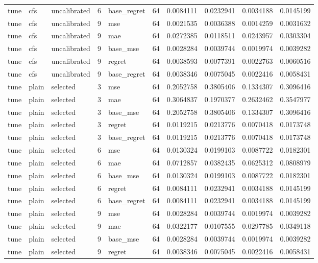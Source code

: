 \begin{tabular}{lllrlrrrrr}
tune & cfs & uncalibrated & 6 & base_regret & 64 & 0.0084111 & 0.0232941 & 0.0034188 & 0.0145199 \\
tune & cfs & uncalibrated & 9 & mse & 64 & 0.0021535 & 0.0036388 & 0.0014259 & 0.0031632 \\
tune & cfs & uncalibrated & 9 & mae & 64 & 0.0272385 & 0.0118511 & 0.0243957 & 0.0303304 \\
tune & cfs & uncalibrated & 9 & base_mse & 64 & 0.0028284 & 0.0039744 & 0.0019974 & 0.0039282 \\
tune & cfs & uncalibrated & 9 & regret & 64 & 0.0038593 & 0.0077391 & 0.0022763 & 0.0060516 \\
tune & cfs & uncalibrated & 9 & base_regret & 64 & 0.0038346 & 0.0075045 & 0.0022416 & 0.0058431 \\
tune & plain & selected & 3 & mse & 64 & 0.2052758 & 0.3805406 & 0.1334307 & 0.3096416 \\
tune & plain & selected & 3 & mae & 64 & 0.3064837 & 0.1970377 & 0.2632462 & 0.3547977 \\
tune & plain & selected & 3 & base_mse & 64 & 0.2052758 & 0.3805406 & 0.1334307 & 0.3096416 \\
tune & plain & selected & 3 & regret & 64 & 0.0119215 & 0.0213776 & 0.0070418 & 0.0173748 \\
tune & plain & selected & 3 & base_regret & 64 & 0.0119215 & 0.0213776 & 0.0070418 & 0.0173748 \\
tune & plain & selected & 6 & mse & 64 & 0.0130324 & 0.0199103 & 0.0087722 & 0.0182301 \\
tune & plain & selected & 6 & mae & 64 & 0.0712857 & 0.0382435 & 0.0625312 & 0.0808979 \\
tune & plain & selected & 6 & base_mse & 64 & 0.0130324 & 0.0199103 & 0.0087722 & 0.0182301 \\
tune & plain & selected & 6 & regret & 64 & 0.0084111 & 0.0232941 & 0.0034188 & 0.0145199 \\
tune & plain & selected & 6 & base_regret & 64 & 0.0084111 & 0.0232941 & 0.0034188 & 0.0145199 \\
tune & plain & selected & 9 & mse & 64 & 0.0028284 & 0.0039744 & 0.0019974 & 0.0039282 \\
tune & plain & selected & 9 & mae & 64 & 0.0322177 & 0.0107555 & 0.0297785 & 0.0349118 \\
tune & plain & selected & 9 & base_mse & 64 & 0.0028284 & 0.0039744 & 0.0019974 & 0.0039282 \\
tune & plain & selected & 9 & regret & 64 & 0.0038346 & 0.0075045 & 0.0022416 & 0.0058431 \\

\end{tabular}
